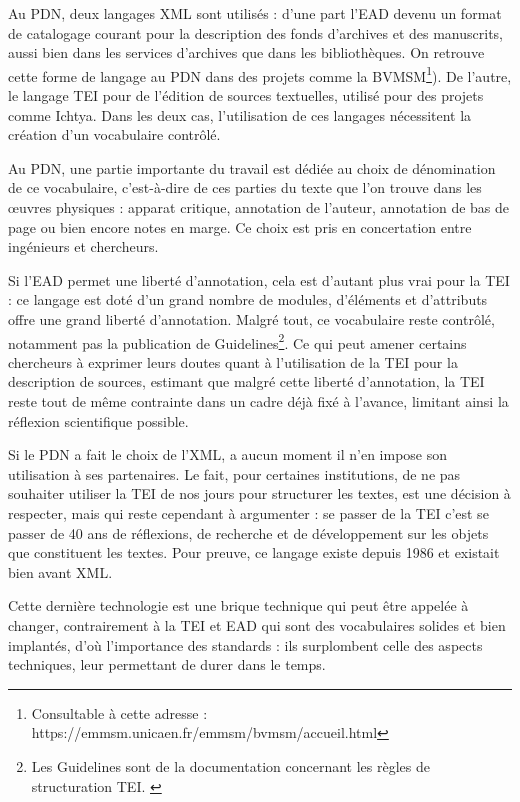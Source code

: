 \documentclass[a4paper,12pt,twoside]{book}
\begin{document}
   Au \acrshort{PDN}, deux langages XML sont utilisés : d'une part l'\acrshort{EAD} devenu un format de catalogage courant pour la description des fonds d'archives et des manuscrits, aussi bien dans les services d'archives que dans les bibliothèques. On retrouve cette forme de langage au \acrshort{PDN} dans des projets comme la \acrfull{BVMSM}\footnote{Consultable à cette adresse : https://emmsm.unicaen.fr/emmsm/bvmsm/accueil.html}). De l'autre, le langage TEI pour de l'édition de sources textuelles, utilisé pour des projets comme Ichtya. Dans les deux cas, l'utilisation de ces langages nécessitent la création d'un vocabulaire contrôlé.
   
   Au \acrshort{PDN}, une partie importante du travail est dédiée au choix de dénomination de ce vocabulaire, c'est-à-dire de ces parties du texte que l'on trouve dans les \oe{}uvres physiques : apparat critique, annotation de l'auteur, annotation de bas de page ou bien encore notes en marge. Ce choix est pris en concertation entre ingénieurs et chercheurs.
   
   Si l'\acrshort{EAD} permet une liberté d'annotation, cela est d'autant plus vrai pour la \acrshort{TEI} : ce langage est doté d'un grand nombre de modules, d'éléments et d'attributs offre une grand liberté d'annotation. Malgré tout, ce vocabulaire reste contrôlé, notamment pas la publication de Guidelines\footnote{Les Guidelines sont de la documentation concernant les règles de structuration TEI. \cite{guidelines}}. Ce qui peut amener certains chercheurs à exprimer leurs doutes quant à l'utilisation de la TEI pour la description de sources, estimant que malgré cette liberté d'annotation, la \acrshort{TEI} reste tout de même contrainte dans un cadre déjà fixé à l'avance, limitant ainsi la réflexion scientifique possible.
   
   Si le \acrshort{PDN} a fait le choix de l'\acrshort{XML}, a aucun moment il n'en impose son utilisation à ses partenaires. Le fait, pour certaines institutions, de ne pas souhaiter utiliser la \acrshort{TEI} de nos jours pour structurer les textes, est une décision à respecter, mais qui reste cependant à argumenter : se passer de la \acrshort{TEI} c'est se passer de 40 ans de réflexions, de recherche et de développement sur les objets que constituent les textes. Pour preuve, ce langage existe depuis 1986 et existait bien avant \acrshort{XML}.
   
   Cette dernière technologie est une brique technique qui peut être appelée à changer, contrairement à la \acrshort{TEI} et \acrshort{EAD} qui sont des vocabulaires solides et bien implantés, d'où l'importance des standards : ils surplombent celle des aspects techniques, leur permettant de durer dans le temps.
   
\end{document}
